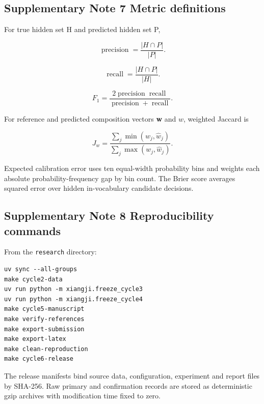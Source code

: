 \documentclass[11pt]{article}
\begin{document}
\subsection{Supplementary Note 7 Metric definitions}

For true hidden set H and predicted hidden set P,

\begin{equation}
\label{eq:supp-precision}
\operatorname{precision}=\frac{|H\cap P|}{|P|}.
\end{equation}

\begin{equation}
\label{eq:supp-recall}
\operatorname{recall}=\frac{|H\cap P|}{|H|}.
\end{equation}

\begin{equation}
\label{eq:supp-f1}
F_1=\frac{2\operatorname{precision}\operatorname{recall}}{\operatorname{precision}+\operatorname{recall}}.
\end{equation}

For reference and predicted composition vectors \textbf{w} and \ensuremath{\hat{w}}, weighted Jaccard is

\begin{equation}
\label{eq:supp-weighted-jaccard}
J_w=\frac{\sum_j\min(w_j,\widehat w_j)}{\sum_j\max(w_j,\widehat w_j)}.
\end{equation}

Expected calibration error uses ten equal-width probability bins and weights each absolute probability-frequency gap by bin count. The Brier score averages squared error over hidden in-vocabulary candidate decisions.

\subsection{Supplementary Note 8 Reproducibility commands}

From the \texttt{research} directory:

\begin{verbatim}
uv sync --all-groups
make cycle2-data
uv run python -m xiangji.freeze_cycle3
uv run python -m xiangji.freeze_cycle4
make cycle5-manuscript
make verify-references
make export-submission
make export-latex
make clean-reproduction
make cycle6-release
\end{verbatim}

The release manifests bind source data, configuration, experiment and report files by SHA-256. Raw primary and confirmation records are stored as deterministic gzip archives with modification time fixed to zero.
\end{document}
